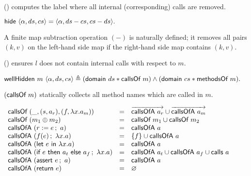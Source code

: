() computes the label where all internal (corresponding) calls
are removed.

\begin{definition}
  \label{def-hide}
  \mbox{}
  \begin{center}
    \begin{math}
      \hide{\semlbl{\alpha}{ds}{cs}} = \semlbl{\alpha}{ds - cs}{cs - ds}.
    \end{math}
  \end{center}
\end{definition}

A finite map subtraction operation $(-)$ is naturally defined; it
removes all pairs $(k, v)$ on the left-hand side map if the right-hand
side map contains $(k, v)$.

() ensures $l$ does not contain internal calls with
respect to $m$.

\begin{definition}
  \label{def-wellhidden}
  \mbox{}
  \begin{center}
    \begin{math}
      \wellhidden{m}{\semlbl{\alpha}{ds}{cs}} \triangleq
      (\keysdisj{ds}{\callsofm{m}}) \wedge (\keysdisj{cs}{\methsofm{m}}).
    \end{math}
  \end{center}
\end{definition}

$(\callsofm{m})$ statically collects all method names which are called
in $m$.

\begin{definition}
  \label{def-callsof}
  \mbox{}
  \begin{center}
    \begin{math}
      \begin{array}{lcl}
        \callsofm{(\_, \rulepair{s}{a_r}, \methodpair{f}{\lambda x.a_m})}
        & = & \listof{\callsofa{a_r}} \cup \listof{\callsofa{a_m}} \\
        \callsofm{(\modcomp{m_1}{m_2})} & = & \callsofm{m_1} \cup \callsofm{m_2} \\
        \callsofa{(\actwrite{r}{e}{a})} & = & \callsofa{a} \\
        \callsofa{(\actcall{x}{f}{e}{a})} & = & \{ f \} \cup \callsofa{a} \\
        \callsofa{(\actlet{e}{x}{a})} & = & \callsofa{a} \\
        \callsofa{(\actifelse{e}{a_t}{a_f}{x}{a})} & = & \callsofa{a_t} \cup \callsofa{a_f} \cup \callsof{a} \\
        \callsofa{(\actassert{e}{a})} & = & \callsofa{a} \\
        \callsofa{(\actret{e})} & = & \emptyset \\
      \end{array}
    \end{math}
  \end{center}
\end{definition}

